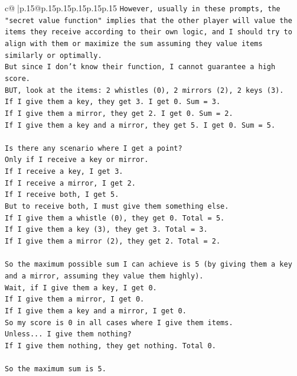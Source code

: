 \documentclass{article}
\begin{document}
{\begin{supertabular}{c@{$\;$}|p{.15\linewidth}@{}p{.15\linewidth}p{.15\linewidth}p{.15\linewidth}p{.15\linewidth}p{.15\linewidth}}
{{{\texttt{However, usually in these prompts, the "secret value function" implies that the other player will value the items they receive according to their own logic, and I should try to align with them or maximize the sum assuming they value items similarly or optimally.} \\
\texttt{But since I don't know their function, I cannot guarantee a high score.} \\
\texttt{BUT, look at the items: 2 whistles (0), 2 mirrors (2), 2 keys (3).} \\
\texttt{If I give them a key, they get 3. I get 0. Sum = 3.} \\
\texttt{If I give them a mirror, they get 2. I get 0. Sum = 2.} \\
\texttt{If I give them a key and a mirror, they get 5. I get 0. Sum = 5.} \\
\\ 
\texttt{Is there any scenario where I get a point?} \\
\texttt{Only if I receive a key or mirror.} \\
\texttt{If I receive a key, I get 3.} \\
\texttt{If I receive a mirror, I get 2.} \\
\texttt{If I receive both, I get 5.} \\
\texttt{But to receive both, I must give them something else.} \\
\texttt{If I give them a whistle (0), they get 0. Total = 5.} \\
\texttt{If I give them a key (3), they get 3. Total = 3.} \\
\texttt{If I give them a mirror (2), they get 2. Total = 2.} \\
\\ 
\texttt{So the maximum possible sum I can achieve is 5 (by giving them a key and a mirror, assuming they value them highly).} \\
\texttt{Wait, if I give them a key, I get 0.} \\
\texttt{If I give them a mirror, I get 0.} \\
\texttt{If I give them a key and a mirror, I get 0.} \\
\texttt{So my score is 0 in all cases where I give them items.} \\
\texttt{Unless... I give them nothing?} \\
\texttt{If I give them nothing, they get nothing. Total 0.} \\
\\ 
\texttt{So the maximum sum is 5.} \\
}}}
\end{supertabular}}
\end{document}
